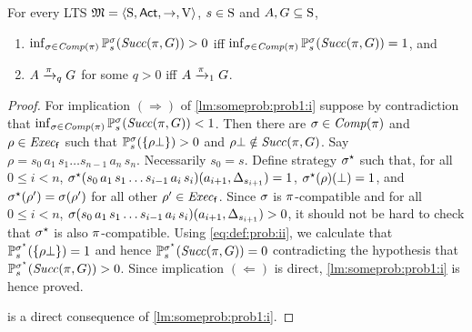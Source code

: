 \begin{lemma}\label{lm:someprob:prob1}
  For every LTS $\model = \tup{\S,\Act,\ra,\V}$, $s\in\S$ and
  $A,G\subseteq\S$,
  \begin{enumerate}
  \item\label{lm:someprob:prob1:i}%
    $\inf_{\strat\in\Comp(\plan)}\Prob^\strat_s(\Succ(\plan,G))>0$ iff\newline
    $\inf_{\strat\in\Comp(\plan)}\Prob^\strat_s(\Succ(\plan,G))=1$, and
  \item\label{lm:someprob:prob1:ii}%
    $A\reach{\plan}_q G$ for some $q>0$ iff $A\reach{\plan}_1 G$.
  \end{enumerate}
\end{lemma}
%
\begin{proof}
  For implication $(\Rightarrow)$ of \cref{lm:someprob:prob1:i}
  suppose by contradiction that
  $\inf_{\strat\in\Comp(\plan)}\Prob^\strat_s(\Succ(\plan,G))<1$.
  Then there are $\strat\in\Comp(\plan)$ and $\rho\in\execf$ such that
  $\Prob^\strat_s(\{\rho\complete\})>0$ and
  $\rho\complete\notin\Succ(\plan,G)$.
  Say $\rho=s_0\, a_1\, s_1\ldots s_{n-1}\, a_n\, s_n$.  Necessarily
  $s_0=s$.
  Define strategy $\strat^\star$ such that, for all $0\leq i<n$,
  $\strat^\star(s_0\, a_1\, s_1\ldots s_{i-1}\, a_i\, s_i)(a_{i+1},\Dirac_{s_{i+1}})=1$,
  $\strat^\star(\rho)(\complete)=1$, and
  $\strat^\star(\rho')=\strat(\rho')$ for all other $\rho'\in\execf$.
  Since $\strat$ is $\plan$-compatible and  for all $0\leq i<n$,
  $\strat(s_0\, a_1\, s_1\ldots s_{i-1}\, a_i\, s_i)(a_{i+1},\Dirac_{s_{i+1}})>0$,
  it should not be hard to check that $\strat^\star$ is also
  $\plan$-compatible.
  Using \cref{eq:def:prob:ii}, we calculate that
  $\Prob^{\strat^\star}_s(\{\rho\complete\})=1$ and hence
  $\Prob^{\strat^\star}_s(\Succ(\plan,G))=0$ contradicting the
  hypothesis that $\Prob^{\strat^\star}_s(\Succ(\plan,G))>0$.
  Since implication $(\Leftarrow)$ is direct,
  \cref{lm:someprob:prob1:i} is hence proved.

   is a direct consequence of
  \cref{lm:someprob:prob1:i}.
\end{proof}

